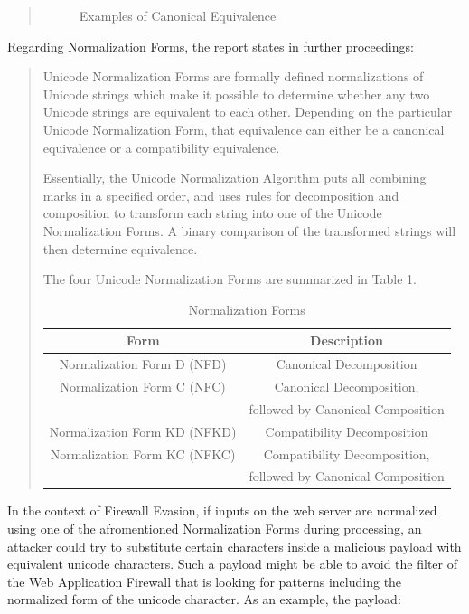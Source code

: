 \begin{quote}
\begin{figure}[h]
		\label{fig:compeq}
		\caption{ Examples of Canonical Equivalence \cite{unicode/normalization}}
	\end{figure}
\end{quote}

Regarding Normalization Forms, the report states in further proceedings:
\begin{quote}
	Unicode Normalization Forms are formally defined normalizations of Unicode strings which make it possible to determine whether any two Unicode strings are equivalent to each other. Depending on the particular Unicode Normalization Form, that equivalence can either be a canonical equivalence or a compatibility equivalence.

	Essentially, the Unicode Normalization Algorithm puts all combining marks in a specified order, and uses rules for decomposition and composition to transform each string into one of the Unicode Normalization Forms. A binary comparison of the transformed strings will then determine equivalence.

	The four Unicode Normalization Forms are summarized in Table 1. \cite{unicode/normalization}
	\begin{table}[h]
		\centering
		\label{tab:normform}
		\caption{ Normalization Forms }
		\begin{tabular}{ |c|c| }
			\hline
			Form                         & Description                       \\
			\hline
			\hline
			Normalization Form D (NFD)   & Canonical Decomposition           \\
			\hline
			Normalization Form C (NFC)   & Canonical Decomposition,          \\
			                             & followed by Canonical Composition \\
			\hline
			Normalization Form KD (NFKD) & Compatibility Decomposition       \\
			Normalization Form KC (NFKC) & Compatibility Decomposition,      \\
			                             & followed by Canonical Composition \\
			\hline
		\end{tabular}
	\end{table}
\end{quote}
In the context of Firewall Evasion, if inputs on the web server are normalized using one of the afromentioned Normalization Forms during processing, an attacker could try to substitute certain characters inside a malicious payload with equivalent unicode characters. \cite{medium/allypetitt} Such a payload might be able to avoid the filter of the Web Application Firewall that is looking for patterns including the normalized form of the unicode character. As an example, the payload:

